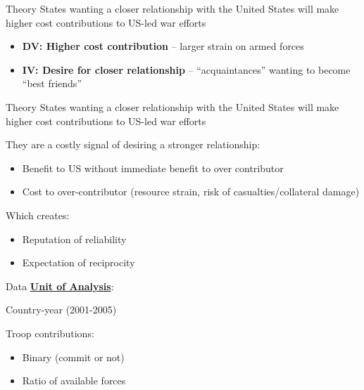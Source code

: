 \documentclass[11pt]{beamer}
\begin{document}
\begin{frame}{Theory}
  States wanting a closer relationship with the United States will make higher cost contributions to US-led war efforts

  \begin{itemize}
    \item \textbf{DV: Higher cost contribution} -- larger strain on armed forces
    \item \textbf{IV: Desire for closer relationship} -- ``acquaintances'' wanting to become ``best friends''
  \end{itemize}
\end{frame}

\begin{frame}{Theory}
  States wanting a closer relationship with the United States will make higher cost contributions to US-led war efforts

  They are a costly signal of desiring a stronger relationship:
  \begin{itemize}
    \item Benefit to US without immediate benefit to over contributor
    \item Cost to over-contributor (resource strain, risk of casualties/collateral damage)
  \end{itemize}

  Which creates:
  \begin{itemize}
    \item Reputation of reliability
    \item Expectation of reciprocity
  \end{itemize}
\end{frame}

\begin{frame}{Data}
\textbf{\underline{Unit of Analysis}}:

Country-year (2001-2005)

Troop contributions:
\begin{itemize}
  \item Binary (commit or not)
  \item Ratio of available forces
\end{itemize}

\end{frame}
\end{document}
